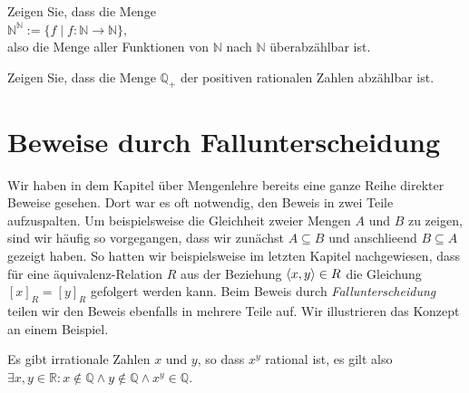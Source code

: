 \exercise
Zeigen Sie, dass die Menge
\\[0.2cm]
\hspace*{1.3cm}
$\mathbb{N}^\mathbb{N} := \{ f \mid f: \mathbb{N} \rightarrow \mathbb{N} \}$,
\\[0.2cm]
also die Menge aller Funktionen von $\mathbb{N}$ nach $\mathbb{N}$ \"{u}berabz\"{a}hlbar ist.
\exend

\exercise
Zeigen Sie, dass die Menge $\mathbb{Q}_+$ der positiven rationalen Zahlen abz\"{a}hlbar ist.
\exend

\section{Beweise durch Fallunterscheidung}
Wir haben in dem Kapitel \"{u}ber Mengenlehre bereits eine ganze Reihe direkter Beweise gesehen.
Dort war es oft notwendig, den Beweis in zwei Teile aufzuspalten.
Um beispielsweise die Gleichheit zweier Mengen $A$ und $B$ zu zeigen, sind wir 
h\"{a}ufig so vorgegangen, dass wir zun\"{a}chst 
$A \subseteq B$ und anschlie\3end $B \subseteq A$ gezeigt haben.  So hatten wir beispielsweise  im
letzten Kapitel nachgewiesen, dass f\"{u}r eine \"{a}quivalenz-Relation $R$ aus der Beziehung $\pair(x,y) \in R$ die
Gleichung $[x]_R = [y]_R$ gefolgert werden kann.  Beim Beweis durch \emph{Fallunterscheidung} teilen
wir den Beweis ebenfalls in mehrere Teile auf.  Wir illustrieren das Konzept an einem Beispiel.

\begin{Satz}
  Es gibt irrationale Zahlen $x$ und $y$, so dass $x^y$ rational ist, es gilt also
  \\[0.2cm]
  \hspace*{1.3cm}
  $\exists x, y \in \mathbb{R}: x \not\in \mathbb{Q} \wedge y \not\in \mathbb{Q} \wedge x^y \in \mathbb{Q}$.
\end{Satz}

